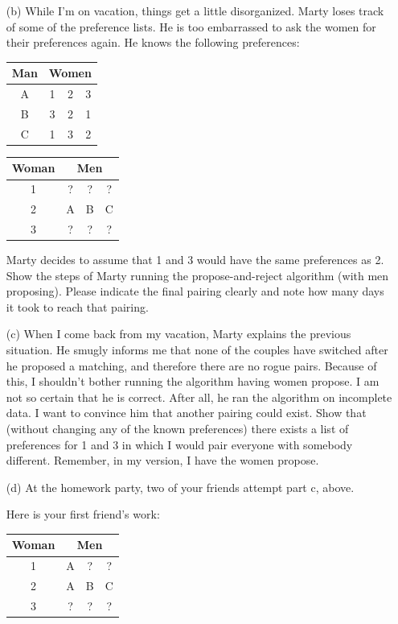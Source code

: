 \documentclass[11pt]{article}
\begin{document}
\begin{qunlist}
\begin{itemize}
\item[(b)] While I'm on vacation, things get a little disorganized. Marty loses track of some of the preference lists. He is too embarrassed to ask the women for their preferences again. He knows the following preferences:

\begin{center}
\begin{tabular}{|c|ccc|}\hline 
Man&\multicolumn{3}{|c|}{Women}\\\hline 
A&1&2&3\\\hline 
B&3&2&1\\\hline 
C&1&3&2\\\hline
\end{tabular} 
\hspace{2cm}
\begin{tabular}{|c|ccc|}\hline 
Woman&\multicolumn{3}{|c|}{Men}\\\hline 
1&?&?&?\\\hline 
2&A&B&C\\\hline 
3&?&?&?\\\hline
\end{tabular}
\end{center}
   
   Marty decides to assume that 1 and 3 would have the same preferences as 2. Show the steps of Marty running the propose-and-reject algorithm (with men proposing). Please indicate the final pairing clearly and note how many days it took to reach that pairing.

\item[(c)] When I come back from my vacation, Marty explains the previous situation. He smugly informs me that none of the couples have switched after he proposed a matching, and therefore there are no rogue pairs. Because of this, I shouldn't bother running the algorithm having women propose. I am not so certain that he is correct. After all, he ran the algorithm on incomplete data. I want to convince him that another pairing could exist. Show that (without changing any of the known preferences) there exists a list of preferences for 1 and 3 in which I would pair everyone with somebody different. Remember, in my version, I have the women propose.

\item[(d)] At the homework party, two of your friends attempt part c, above. 

Here is your first friend's work: 

\begin{center}
\begin{tabular}{|c|ccc|}\hline 
Woman&\multicolumn{3}{|c|}{Men}\\\hline 
1&A&?&?\\\hline 
2&A&B&C\\\hline 
3&?&?&?\\\hline
\end{tabular} 
\end{center}


\end{itemize}
\end{qunlist}
\end{document}

